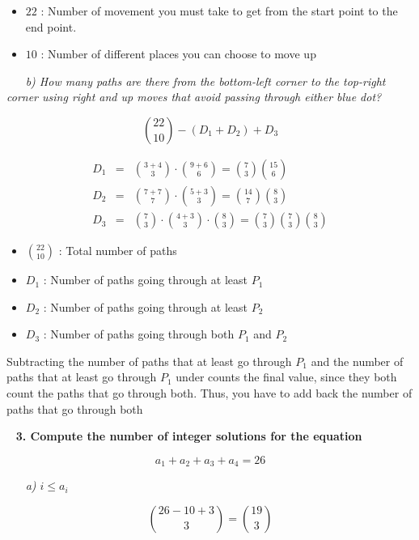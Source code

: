 \documentclass[12pt, letterpaper]{article}
\begin{document}
\begin{itemize}
    \item \(22 \) : Number of movement you must take to get from the start point to the end point.
    \item \(10\) : Number of different places you can choose to move up
\end{itemize} 

\-\ \newline
\-\ \it{ b) How many paths are there from the bottom-left corner to the top-right corner using right and up moves that
avoid passing through either blue dot? }

\[ {22 \choose 10} - (D_1 + D_2) + D_3 \]

\begin{eqnarray}
    D_1 &=& {3 + 4 \choose 3} \cdot {9 + 6 \choose 6} = {7 \choose 3}{15 \choose 6} \\
    D_2 &=& {7 + 7 \choose 7} \cdot {5 + 3 \choose 3} = {14 \choose 7}{8 \choose 3} \\
    D_3 &=& {7 \choose 3} \cdot {4 + 3 \choose 3} \cdot {8 \choose 3} = {7 \choose 3}{7 \choose 3}{8 \choose 3}
\end{eqnarray}

\begin{itemize}
    \item \( {22 \choose 10} \) : Total number of paths
    \item \( {D_1} \) : Number of paths going through at least \(P_1\)
    \item \( {D_2} \) : Number of paths going through at least \(P_2\)
    \item \( {D_3} \) : Number of paths going through both \(P_1\) and \(P_2\)
\end{itemize} 

\textnormal{ Subtracting the number of paths that at least go through \(P_1\) and the number of paths that at least go through \(P_1\) under counts the final value, since they both count the paths that go through both.  }
\textnormal{ Thus, you have to add back the number of paths that go through both }


\newpage
\-\ \newline
\bf{ 3. Compute the number of integer solutions for the equation }

\[ a_1 + a_2 + a_3 + a_4 = 26 \]

\-\ \newline
\-\ \it{ a) \( i \leq a_i  \) }

\[ {26 - 10 + 3 \choose 3} = {19 \choose 3}\]
\end{document}
